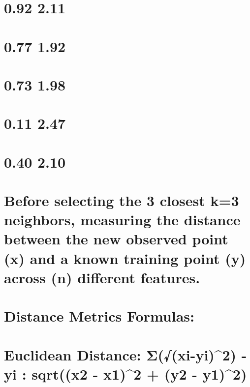\documentclass[
  letterpaper,
  DIV=11,
  numbers=noendperiod]{scrreprt}
\begin{document}
{

\chapter{0.92 2.11}\label{section-8}


\chapter{0.77 1.92}\label{section-9}


\chapter{0.73 1.98}\label{section-10}


\chapter{0.11 2.47}\label{section-11}


\chapter{0.40 2.10}\label{section-12}


\chapter{Before selecting the 3 closest k=3 neighbors, measuring the
distance between the new observed point (x) and a known training point
(y) across (n) different
features.}\label{before-selecting-the-3-closest-k3-neighbors-measuring-the-distance-between-the-new-observed-point-x-and-a-known-training-point-y-across-n-different-features.}


\chapter{Distance Metrics Formulas:}\label{distance-metrics-formulas}


\chapter{Euclidean Distance: Σ(√(xi-yi)\^{}2) - yi : sqrt((x2 - x1)\^{}2
+ (y2 -
y1)\^{}2)}\label{euclidean-distance-ux3c3xi-yi2---yi-sqrtx2---x12-y2---y12}

}
\end{document}
